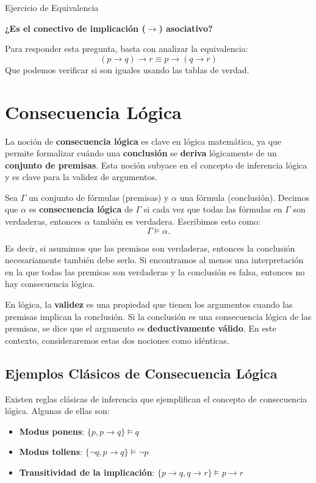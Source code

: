 \begin{exampleblock}{Ejercicio de Equivalencia}
\begin{center}
\textbf{¿Es el conectivo de implicación  ($\rightarrow$) asociativo?}
\end{center}
Para responder esta pregunta, basta con analizar la equivalencia:
\[
(p \rightarrow q ) \rightarrow r  \equiv   p \rightarrow (q  \rightarrow r ) 
\]
Que podemos verificar si son iguales usando las tablas de verdad.
\end{exampleblock}


\section{Consecuencia Lógica}

La noción de \textbf{consecuencia lógica} es clave en lógica matemática, ya que permite formalizar cuándo una \textbf{conclusión} se \textbf{deriva} lógicamente de un \textbf{conjunto de premisas}. Esta noción subyace en el concepto de inferencia lógica y es clave para la validez de argumentos.

Sea $\Gamma$ un conjunto de fórmulas (premisas) y $\alpha$ una fórmula (conclusión). Decimos que $\alpha$ es \textbf{consecuencia lógica} de $\Gamma$ si cada vez que todas las fórmulas en $\Gamma$ son verdaderas, entonces $\alpha$ también es verdadera. Escribimos esto como:
\[ \Gamma \models \alpha. \]

Es decir, si asumimos que las premisas son verdaderas, entonces la conclusión necesariamente también debe serlo. Si encontramos al menos una interpretación en la que todas las premisas son verdaderas y la conclusión es falsa, entonces no hay consecuencia lógica.

En lógica, la \textbf{validez} es una propiedad que tienen los argumentos cuando las premisas implican la conclusión. Si la conclusión es una consecuencia lógica de las premisas, se dice que el argumento es \textbf{deductivamente válido}. En este contexto, consideraremos estas dos nociones como idénticas.


\subsection{Ejemplos Clásicos de Consecuencia Lógica}

Existen reglas clásicas de inferencia que ejemplifican el concepto de consecuencia lógica. Algunas de ellas son:

\begin{itemize}
    \item \textbf{Modus ponens}: \quad $\{p, p \rightarrow q\} \models q$
    \item \textbf{Modus tollens}: \quad $\{\neg q, p \rightarrow q\} \models \neg p$
    \item \textbf{Transitividad de la implicación}: \quad $\{p \rightarrow q, q \rightarrow r\} \models p \rightarrow r$
\end{itemize}

